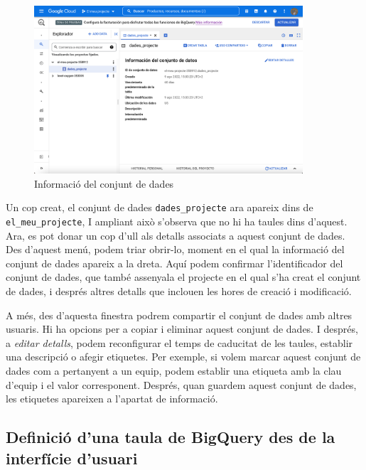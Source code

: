 \documentclass[12pt,longbibliography]{article}
\theoremstyle{definition}
\theoremstyle{remark}
\begin{document}
\vspace{2mm}
\begin{figure}[h!]
\begin{center}
\includegraphics[width=10cm]{bq5}
\end{center}
\caption{Informació del conjunt de dades}
\label{fig:bq5}
\end{figure}
\vspace{2mm}

Un cop creat, el conjunt de dades \verb|dades_projecte| ara apareix dins de \verb|el_meu_projecte|, I ampliant això s'observa que no hi ha taules dins d'aquest. Ara, es pot donar un cop d'ull als detalls associats a aquest conjunt de dades. Des d'aquest menú, podem triar obrir-lo, moment en el qual la informació del conjunt de dades apareix a la dreta. Aquí podem confirmar l'identificador del conjunt de dades, que també assenyala el projecte en el qual s'ha creat el conjunt de dades, i després altres detalls que inclouen les hores de creació i modificació. 

\vspace{2mm}

A més, des d'aquesta finestra podrem compartir el conjunt de dades amb altres usuaris. Hi ha opcions per a copiar i eliminar aquest conjunt de dades. I després, a \textit{editar detalls}, podem reconfigurar el temps de caducitat de les taules, establir una descripció o afegir etiquetes. Per exemple, si volem marcar aquest conjunt de dades com a pertanyent a un equip, podem establir una etiqueta amb la clau d'equip i el valor corresponent. Després, quan guardem aquest conjunt de dades, les etiquetes apareixen a l'apartat de informació.

\subsection{Definició d'una taula de BigQuery des de la interfície d'usuari}
\end{document}
